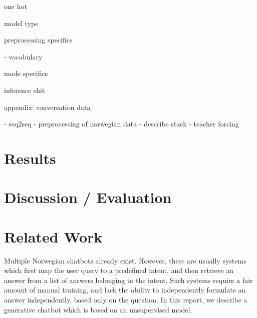 \documentclass{article}
\begin{document}
one hot

model type

preprocessing specifics

- vocabulary

mode specifics

inference shit


appendix: conversation data


\if
- seq2seq 
- preprocessing of norwegian data - describe stack 
- teacher forcing
\fi


\section{Results}


\section{Discussion / Evaluation}


\section{Related Work}

Multiple Norwegian chatbots already exist. However, these are usually systems
which first map the user query to a predefined intent, and then retrieve an
answer from a list of answers belonging to the intent. Such systems require a
fair amount of manual training, and lack the ability to independently formulate
an answer independently, based only on the question.  In this report, we
describe a generative chatbot which is based on an unsupervised model.
\end{document}
